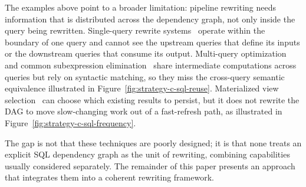 The examples above point to a broader limitation: pipeline rewriting needs information that is distributed across the dependency graph, not only inside the query being rewritten.
Single-query rewrite systems~\cite{wetune,rbot} operate within the boundary of one query and cannot see the upstream queries that define its inputs or the downstream queries that consume its output.
Multi-query optimization and common subexpression elimination~\cite{sellis1988multiple} share intermediate computations across queries but rely on syntactic matching, so they miss the cross-query semantic equivalence illustrated in Figure~\ref{fig:strategy-c-sql-reuse}.
Materialized view selection~\cite{agrawal2000automated} can choose which existing results to persist, but it does not rewrite the DAG to move slow-changing work out of a fast-refresh path, as illustrated in Figure~\ref{fig:strategy-c-sql-frequency}.


The gap is not that these techniques are poorly designed; it is that none treats an explicit SQL dependency graph as the unit of rewriting, combining capabilities usually considered separately. The remainder of this paper presents an approach that integrates them into a coherent rewriting framework.






